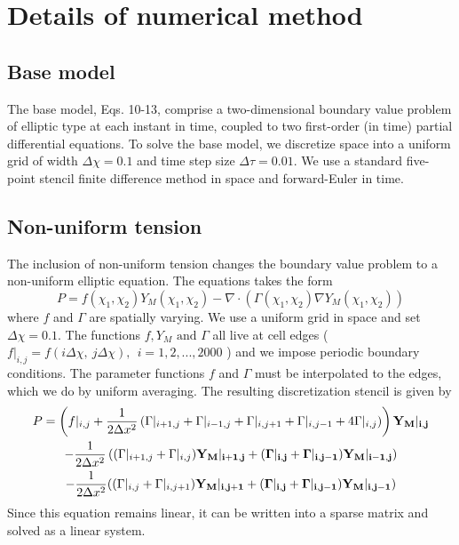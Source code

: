 \section{Details of numerical method}

\subsection{Base model}

The base model, Eqs. 10-13, comprise a two-dimensional boundary value problem of elliptic type at each instant in time, coupled to two first-order (in time) partial differential equations. To solve the base model, we discretize space into a uniform grid of width $\Delta\chi=0.1$ and time step size $\Delta \tau = 0.01$. We use a standard  five-point stencil finite difference method in space and forward-Euler in time.

\subsection{Non-uniform tension}

The inclusion of non-uniform tension changes the boundary value problem to a non-uniform elliptic equation. The equations takes the form 
\begin{equation}
P  = f(\chi_1,\chi_2) Y_M(\chi_1,\chi_2) -\nabla \cdot \left( \Gamma(\chi_1,\chi_2) \nabla Y_M(\chi_1,\chi_2) \right)
\end{equation}
where $f$ and $\Gamma$ are spatially varying. We use a uniform grid in space and set $\Delta \chi = 0.1$. The functions $f, Y_M \text{ and } \Gamma$ all live at cell edges ($ f|_{i,j} = f(i\Delta \chi,\ j\Delta \chi),\ \ i = 1,2,..., 2000$ ) and we impose periodic boundary conditions. The parameter functions $f$ and $\Gamma$ must be interpolated to the edges, which we do by uniform averaging. The resulting discretization stencil is given by
\begin{multline*}
P  = \left(f|_{i,j} + \dfrac{1}{2\Delta x^2} \left(\Gamma|_{i+1,j}+\Gamma|_{i-1,j}+\Gamma|_{i,j+1}+\Gamma|_{i,j-1}+4\Gamma|_{i,j} \right) \right) \bf{ Y_M|_{i,j}}\\
 - \dfrac{1}{2\Delta x^2} \left( (\Gamma|_{i+1,j}+\Gamma|_{i,j}) \bf{ Y_M|_{i+1,j}} +( \Gamma|_{i,j}+\Gamma|_{i,j-1}) \bf{ Y_M|_{i-1,j}} \right) \\
- \dfrac{1}{2\Delta x^2}  ((\Gamma|_{i,j}+\Gamma|_{i,j+1}) \bf{Y_M|_{i,j+1} } +   (\Gamma|_{i,j}+\Gamma|_{i,j-1}) \bf{  Y_M|_{i,j-1}})
\end{multline*}
Since this equation remains linear, it can be written into a sparse matrix and solved as a linear system.

